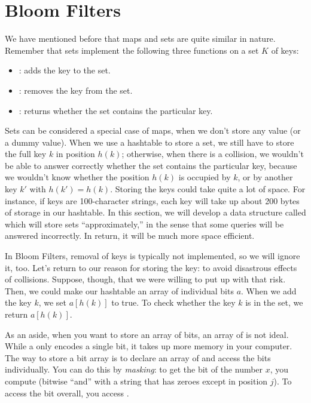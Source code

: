 \section{Bloom Filters}
\label{sec:bloom-filters}
We have mentioned before that maps and sets are quite similar in
nature. Remember that sets implement the following three functions on
a set $K$ of keys:
\begin{itemize}
\item {}: adds the key to the set.
\item {}: removes the key from the set.
\item {}: returns whether the set
  contains the particular key.
\end{itemize}

Sets can be considered a special case of maps, when
we don't store any value (or a dummy value).
When we use a hashtable to store a set, we still have to store the
full key $k$ in position $h(k)$; otherwise, when there is a collision,
we wouldn't be able to answer correctly whether the set contains the
particular key, because we wouldn't know whether the position $h(k)$
is occupied by $k$, or by another key $k'$ with $h(k') = h(k)$.
Storing the keys could take quite a lot of space. For instance, if
keys are 100-character strings, each key will take up about 200 bytes
of storage in our hashtable. In this section, we will develop a data
structure called  which will store sets
``approximately,'' in the sense that some queries will be answered
incorrectly. In return, it will be much more space efficient.

In Bloom Filters, removal of keys is typically not implemented, so we
will ignore it, too. Let's return to our reason for storing the key:
to avoid disastrous effects of collisions. 
Suppose, though, that we were willing to put up with that risk.
Then, we could make our hashtable an array of individual bits $a$.
When we add the key $k$, we set $a[h(k)]$ to true. 
To check whether the key $k$ is in the set, we return $a[h(k)]$.

\begin{remark}
As an aside, when you want to store an array of bits, an array of
 is not ideal. While a  only encodes a single
bit, it takes up more memory in your computer.
The way to store a bit array is to declare an array of  and
access the bits individually. You can do this by \emph{masking}: to
get the  bit of the number $x$, you compute 
(bitwise ``and'' with a string that has zeroes except in position
$j$).
To access the  bit overall, you access 
.
\end{remark}

